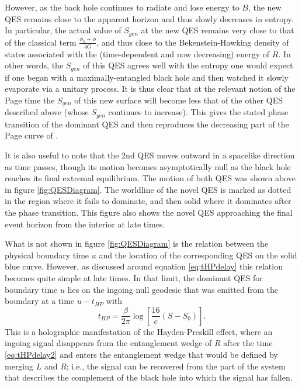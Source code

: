 \documentclass[12pt]{article}
\begin{document}
However, as the back hole continues to radiate and lose energy to $B$, the new QES remains close to the apparent horizon and thus slowly decreases in entropy.  In particular, the actual value of $S_{gen}$ at the new QES remains very close to that of the classical term $\frac{\phi_0 + \phi}{4G}$, and thus close to the Bekenstein-Hawking density of states associated with the (time-dependent and now decreasing) energy of $R$.  In other words, the $S_{gen}$ of this QES agrees well with the entropy one would expect if one began with a maximally-entangled black hole and then watched it slowly evaporate via a unitary process.  It is thus clear that at the relevant notion of the Page time the $S_{gen}$ of this new surface will become less that of the other QES described above (whose $S_{gen}$ continues to increase).  This gives the stated phase transition of the dominant QES and then reproduces the decreasing part of the Page curve of \cite{Page:1993df}.

It is also useful to note that the 2nd QES moves outward in a spacelike direction as time passes, though its motion becomes asymptotically null as the black hole reaches its final extremal equilibrium.  The motion of both QES was shown above in figure \ref{fig:QESDiagram}.  The worldline of the novel QES is marked as dotted in the region where it fails to dominate, and then solid where it dominates after the phase transition.  This figure also shows the novel QES approaching the final event horizon from the interior at late times.

What is not shown in figure \ref{fig:QESDiagram} is the relation between the physical boundary time $u$ and the location of the corresponding QES on the solid blue curve.  However, as discussed around equation \eqref{eq:tHPdelay} this relation becomes quite simple at late times.  In that limit, the dominant QES for boundary time $u$ lies on the ingoing null geodesic that was emitted from the boundary at a time $u-t_{HP}$ with
\begin{equation}
\label{eq:tHPdelay2}
t_{HP} = \frac{\beta}{2\pi} \log \left[\frac{16}{c}(S-S_0) \right].
\end{equation}
This is a holographic manifestation of the Hayden-Preskill effect, where an ingoing signal disappears from the entanglement wedge of $R$ after the time \eqref{eq:tHPdelay2} and enters the entanglement wedge that would be defined by merging $L$ and $R$; i.e., the signal can be recovered from the part of the system that describes the complement of the black hole into which the signal has fallen.
\end{document}
